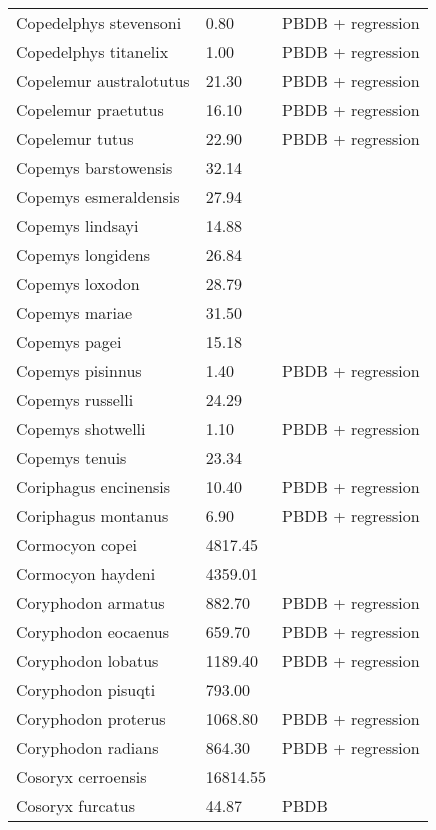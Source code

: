 \begin{longtable}{p{} p{} p{}}
    Copedelphys stevensoni & 0.80 & PBDB + regression \\ 
    Copedelphys titanelix & 1.00 & PBDB + regression \\ 
    Copelemur australotutus & 21.30 & PBDB + regression \\ 
    Copelemur praetutus & 16.10 & PBDB + regression \\ 
    Copelemur tutus & 22.90 & PBDB + regression \\ 
    Copemys barstowensis & 32.14 & \cite{Tomiya2013} \\ 
    Copemys esmeraldensis & 27.94 & \cite{Tomiya2013} \\ 
    Copemys lindsayi & 14.88 & \cite{Tomiya2013} \\ 
    Copemys longidens & 26.84 & \cite{Tomiya2013} \\ 
    Copemys loxodon & 28.79 & \cite{Tomiya2013} \\ 
    Copemys mariae & 31.50 & \cite{Tomiya2013} \\ 
    Copemys pagei & 15.18 & \cite{Tomiya2013} \\ 
    Copemys pisinnus & 1.40 & PBDB + regression \\ 
    Copemys russelli & 24.29 & \cite{Tomiya2013} \\ 
    Copemys shotwelli & 1.10 & PBDB + regression \\ 
    Copemys tenuis & 23.34 & \cite{Tomiya2013} \\ 
    Coriphagus encinensis & 10.40 & PBDB + regression \\ 
    Coriphagus montanus & 6.90 & PBDB + regression \\ 
    Cormocyon copei & 4817.45 & \cite{Tomiya2013} \\ 
    Cormocyon haydeni & 4359.01 & \cite{Tomiya2013} \\ 
    Coryphodon armatus & 882.70 & PBDB + regression \\ 
    Coryphodon eocaenus & 659.70 & PBDB + regression \\ 
    Coryphodon lobatus & 1189.40 & PBDB + regression \\ 
    Coryphodon pisuqti & 793.00 & \cite{Cooke2011} \\ 
    Coryphodon proterus & 1068.80 & PBDB + regression \\ 
    Coryphodon radians & 864.30 & PBDB + regression \\ 
    Cosoryx cerroensis & 16814.55 & \cite{Tomiya2013} \\ 
    Cosoryx furcatus & 44.87 & PBDB \\ 

\end{longtable}
